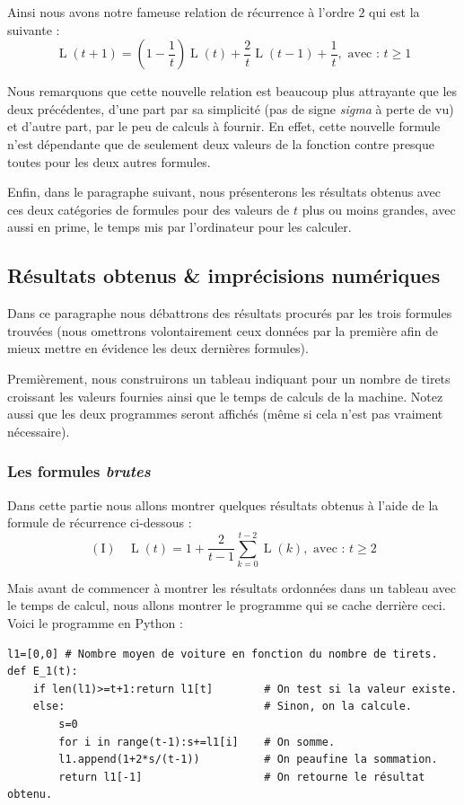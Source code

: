 \documentclass[a4paper,francais,11pt]{article}
\begin{document}
Ainsi nous avons notre fameuse relation de récurrence à l'ordre $2$ qui est la suivante :
\[\operatorname{L}\left(t+1\right)=\left(1-\frac{1}{t}\right)\operatorname{L}\left(t\right)+\frac{2}{t}\operatorname{L}\left(t-1\right)+\frac{1}{t},\text{ avec : $t\geqslant1$}\]

Nous remarquons que cette nouvelle relation est beaucoup plus attrayante que les deux précédentes, d'une part par sa simplicité (pas de signe \emph{sigma} à perte de vu) et d'autre part, par le peu de calculs à fournir. En effet, cette nouvelle formule n'est dépendante que de seulement deux valeurs de la fonction contre presque toutes pour les deux autres formules.

Enfin, dans le paragraphe suivant, nous présenterons les résultats obtenus avec ces deux catégories de formules pour des valeurs de $t$ plus ou moins grandes, avec aussi en prime, le temps mis par l'ordinateur pour les calculer.
\subsection{Résultats obtenus \& imprécisions numériques}
Dans ce paragraphe nous débattrons des résultats procurés par les trois formules trouvées (nous omettrons volontairement ceux données par la première afin de mieux mettre en évidence les deux dernières formules). 

Premièrement, nous construirons un tableau indiquant pour un nombre de tirets croissant les valeurs fournies ainsi que le temps de calculs de la machine. Notez aussi que les deux programmes seront affichés (même si cela n'est pas vraiment nécessaire).
\subsubsection{Les formules \emph{brutes}}
Dans cette partie nous allons montrer quelques résultats obtenus à l'aide de la formule de récurrence ci-dessous :
\[\left(\text{I}\right)\ \ \ \ \operatorname{L}\left(t\right)=1+\frac{2}{t-1}\sum_{k=0}^{t-2}\operatorname{L}\left(k\right),\text{ avec : $t\geqslant2$}\]

Mais avant de commencer à montrer les résultats ordonnées dans un tableau avec le temps de calcul, nous allons montrer le programme qui se cache derrière ceci. Voici le programme en Python :
\begin{center}
\begin{verbatim}
l1=[0,0] # Nombre moyen de voiture en fonction du nombre de tirets.
def E_1(t):
    if len(l1)>=t+1:return l1[t]        # On test si la valeur existe.
    else:                               # Sinon, on la calcule.
        s=0
        for i in range(t-1):s+=l1[i]    # On somme.
        l1.append(1+2*s/(t-1))          # On peaufine la sommation.
        return l1[-1]                   # On retourne le résultat obtenu.
\end{verbatim}
\end{center}
\end{document}
